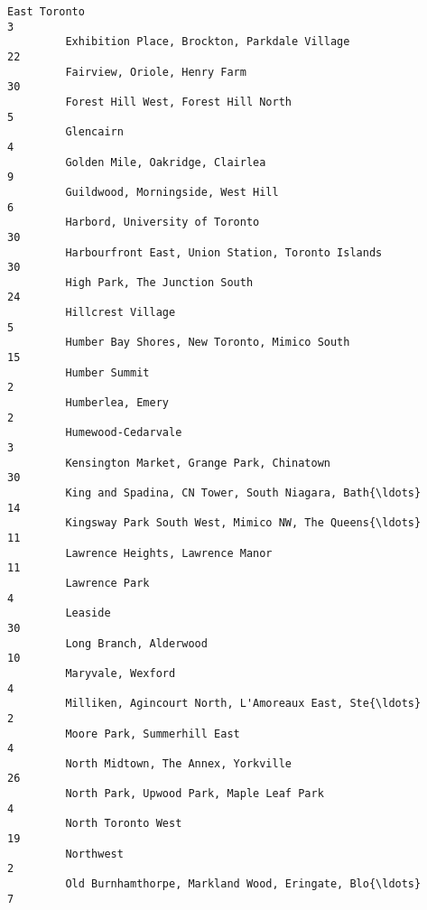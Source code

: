 \documentclass[11pt]{article}
\begin{document}
\begin{Verbatim}[commandchars=\\\{\}]
         East Toronto                                                             3   
         Exhibition Place, Brockton, Parkdale Village                            22   
         Fairview, Oriole, Henry Farm                                            30   
         Forest Hill West, Forest Hill North                                      5   
         Glencairn                                                                4   
         Golden Mile, Oakridge, Clairlea                                          9   
         Guildwood, Morningside, West Hill                                        6   
         Harbord, University of Toronto                                          30   
         Harbourfront East, Union Station, Toronto Islands                       30   
         High Park, The Junction South                                           24   
         Hillcrest Village                                                        5   
         Humber Bay Shores, New Toronto, Mimico South                            15   
         Humber Summit                                                            2   
         Humberlea, Emery                                                         2   
         Humewood-Cedarvale                                                       3   
         Kensington Market, Grange Park, Chinatown                               30   
         King and Spadina, CN Tower, South Niagara, Bath{\ldots}                      14   
         Kingsway Park South West, Mimico NW, The Queens{\ldots}                      11   
         Lawrence Heights, Lawrence Manor                                        11   
         Lawrence Park                                                            4   
         Leaside                                                                 30   
         Long Branch, Alderwood                                                  10   
         Maryvale, Wexford                                                        4   
         Milliken, Agincourt North, L'Amoreaux East, Ste{\ldots}                       2   
         Moore Park, Summerhill East                                              4   
         North Midtown, The Annex, Yorkville                                     26   
         North Park, Upwood Park, Maple Leaf Park                                 4   
         North Toronto West                                                      19   
         Northwest                                                                2   
         Old Burnhamthorpe, Markland Wood, Eringate, Blo{\ldots}                       7   

\end{Verbatim}
\end{document}
